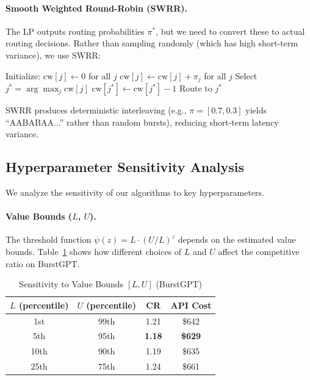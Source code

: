 \paragraph{Smooth Weighted Round-Robin (SWRR).}
The LP outputs routing probabilities $\pi^*$, but we need to convert these to actual routing decisions. Rather than sampling randomly (which has high short-term variance), we use SWRR:
\begin{algorithm}[H]
\caption{Smooth Weighted Round-Robin (SWRR)}
\label{alg:swrr}
\begin{algorithmic}
\STATE Initialize: $\text{cw}[j] \gets 0$ for all $j$
    \STATE $\text{cw}[j] \gets \text{cw}[j] + \pi_j$ for all $j$
    \STATE Select $j^* = \arg\max_j \text{cw}[j]$
    \STATE $\text{cw}[j^*] \gets \text{cw}[j^*] - 1$
    \STATE Route to $j^*$
\ENDFOR
\end{algorithmic}
\end{algorithm}
SWRR produces deterministic interleaving (e.g., $\pi = [0.7, 0.3]$ yields ``AABABAA...'' rather than random bursts), reducing short-term latency variance.

\subsection{Hyperparameter Sensitivity Analysis}
\label{app:hyperparameters}

We analyze the sensitivity of our algorithms to key hyperparameters.

\paragraph{Value Bounds ($L$, $U$).}
The threshold function $\psi(z) = L \cdot (U/L)^z$ depends on the estimated value bounds. Table~\ref{tab:lu_sensitivity} shows how different choices of $L$ and $U$ affect the competitive ratio on BurstGPT.

\begin{table}[h]
\caption{Sensitivity to Value Bounds $[L, U]$ (BurstGPT)}
\label{tab:lu_sensitivity}
\begin{center}
\begin{tabular}{cccc}
\toprule
$L$ (percentile) & $U$ (percentile) & CR & API Cost \\
\midrule
1st & 99th & 1.21 & \$642 \\
5th & 95th & \textbf{1.18} & \textbf{\$629} \\
10th & 90th & 1.19 & \$635 \\
25th & 75th & 1.24 & \$661 \\
\bottomrule
\end{tabular}
\end{center}
\end{table}

